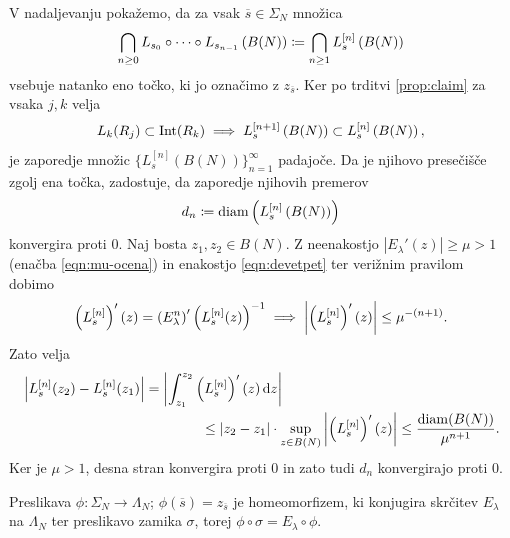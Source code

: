 V nadaljevanju pokažemo, da za vsak \(\overline{s} \in \Sigma_N\) množica
\[\bigcap_{n \geq 0} L_{s_0} \circ \dots \circ L_{s_{n - 1}} \left( B (N) \right) \coloneq \bigcap_{n \geq 1} L_s^{[n]} \left( B (N) \right)\]
vsebuje natanko eno točko, ki jo označimo z \(z_{\overline{s}}\). Ker po trditvi \ref{prop:claim} za vsaka \(j, k\) velja
\[L_k (R_j) \subset \operatorname{Int} (R_k) \implies L_s^{[n + 1]} \left( B (N) \right) \subset L_s^{[n]} \left( B (N) \right),\]
je zaporedje množic \(\{L_s^{[n]} (B (N))\}_{n = 1}^{\infty}\) padajoče. Da je njihovo presečišče zgolj ena točka, zadostuje, da zaporedje njihovih premerov
\[d_n \coloneq \operatorname{diam} \left( L_s^{[n]} \left( B (N) \right) \right)\]
konvergira proti \num{0}. Naj bosta \(z_1, z_2 \in B(N)\). Z neenakostjo \(|E_\lambda' (z)| \geq \mu > 1\) (enačba \eqref{eqn:mu-ocena}) in enakostjo \eqref{eqn:devetpet} ter verižnim pravilom dobimo
\[\left( L_s^{[n]} \right)' (z) = \left( E_\lambda^n \right)' \left( L_s^{[n]} (z) \right)^{-1} \implies \left\lvert\left( L_s^{[n]} \right)' (z)\right\rvert \leq \mu^{- (n + 1)}.\]
Zato velja
\[ \begin{multlined}[12cm]
        \left| L_s^{[n]}(z_2) - L_s^{[n]}(z_1) \right| = \left| \int_{z_1}^{z_2} \prt{L_s^{[n]}}' (z) \, \dd z \right|\\
        \leq |z_2 - z_1| \cdot \sup_{z \in B(N)}\left| \left( L_s^{[n]} \right)'(z) \right| \leq \frac{\diam (B(N))}{\mu^{n+1}}.
    \end{multlined} \]
Ker je \(\mu > 1\), desna stran konvergira proti \num{0} in zato tudi \(d_n\) konvergirajo proti \num{0}.

\begin{izrek}
    Preslikava \(\phi \colon \Sigma_N \to \Lambda_N\); \(\phi (\overline{s}) = z_{\overline{s}}\) je homeomorfizem, ki konjugira skrčitev \(E_\lambda\) na \(\Lambda_N\) ter preslikavo zamika \(\sigma\), torej \(\phi \circ \sigma = E_\lambda \circ \phi\).
\end{izrek}

